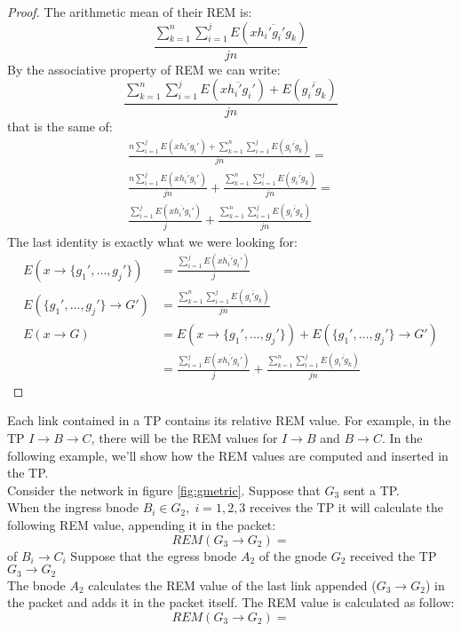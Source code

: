 \documentclass[a4paper]{article}
\begin{document}
\begin{enumerate}
\begin{proof}
			The arithmetic mean of their REM is:
			\[
			\frac{\sum_{k=1}^n \sum_{i=1}^j
			E(\overline{xh_i'g_i'g_k})}{jn}
			\]
			By the associative property of REM we can write:
			\[
			\frac{\sum_{k=1}^n \sum_{i=1}^j
			E(\overline{xh_i'g_i'})+E(\overline{g_i'g_k})}{jn}
			\]
			that is the same of:
			\begin{align*}
			\frac{n\sum_{i=1}^j E(\overline{xh_i'g_i'})+\sum_{k=1}^n \sum_{i=1}^j
			E(\overline{g_i'g_k})}{jn}=\\
			\frac{n\sum_{i=1}^j E(\overline{xh_i'g_i'})}{jn}+\frac{\sum_{k=1}^n \sum_{i=1}^j
                        E(\overline{g_i'g_k})}{jn}=\\
			\frac{\sum_{i=1}^j E(\overline{xh_i'g_i'})}{j}+\frac{\sum_{k=1}^n \sum_{i=1}^j
                        E(\overline{g_i'g_k})}{jn}
			\end{align*}
			The last identity is exactly what we were looking for:
			\begin{align*}
			E(x \rightarrow
			\{g_1',\dots,g_j'\})&=\frac{\sum_{i=1}^j
			E(\overline{xh_i'g_i'})}{j}\\
			E(\{g_1',\dots,g_j'\}\rightarrow
			G')&=\frac{\sum_{k=1}^n
			\sum_{i=1}^jE(\overline{g_i'g_k})}{jn}\\
			E(x\rightarrow G)&=
			E(x \rightarrow \{g_1',\dots,g_j'\}) +
			E(\{g_1',\dots,g_j'\}\rightarrow G')\\
			&= \frac{\sum_{i=1}^j
			E(\overline{xh_i'g_i'})}{j}+\frac{\sum_{k=1}^n
			\sum_{i=1}^jE(\overline{g_i'g_k})}{jn}
		\end{align*}
		\end{proof}
\end{enumerate}


Each link contained in a TP contains its relative REM value. For example, in
the TP $I \rightarrow B \rightarrow  C$, there will be the REM values for $I
\rightarrow B$ and $B\rightarrow C$. In the following example, we'll show how
the REM values are computed and inserted in the TP.\\

Consider the network in figure \ref{fig:gmetric}.
Suppose that $G_3$ sent a TP.\\
When the ingress bnode $B_i \in G_2, \;i=1,2,3$ receives the TP it will
calculate the following REM value, appending it in the packet:
\[
REM(G_3\rightarrow G_2) = 
\]
of $B_i \rightarrow  C_i$
Suppose that the egress bnode $A_2$ of the gnode $G_2$ received the TP $G_3
\rightarrow  G_2$\\
The bnode $A_2$ calculates the REM value of the last link appended ($G_3
\rightarrow  G_2$) in the packet and adds it in the packet itself.
The REM value is calculated as follow:
\[
REM(G_3\rightarrow G_2) = 
\]
\end{document}
